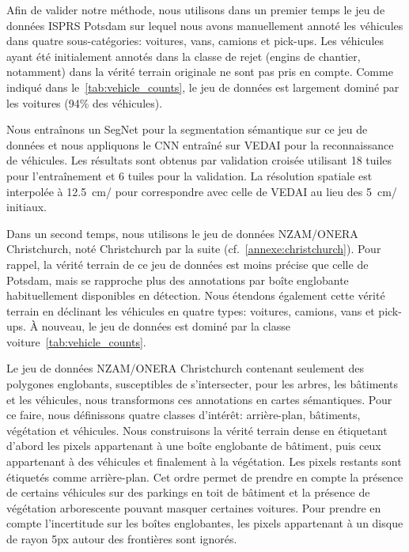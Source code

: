 Afin de valider notre méthode, nous utilisons dans un premier temps le jeu de données \gls{ISPRS} Potsdam sur lequel nous avons manuellement annoté les véhicules dans quatre sous-catégories: voitures, vans, camions et pick-ups. Les véhicules ayant été initialement annotés dans la classe de rejet (engins de chantier, notamment) dans la vérité terrain originale ne sont pas pris en compte. Comme indiqué dans le~\cref{tab:vehicle_counts}, le jeu de données est largement dominé par les voitures (94\% des véhicules).

Nous entraînons un SegNet pour la segmentation sémantique sur ce jeu de données et nous appliquons le \gls{CNN} entraîné sur \gls{VEDAI} pour la reconnaissance de véhicules. Les résultats sont obtenus par validation croisée utilisant 18 tuiles pour l'entraînement et 6 tuiles pour la validation. La résolution spatiale est interpolée à \SI{12,5}{\centi\meter/\px} pour correspondre avec celle de \gls{VEDAI} au lieu des \SI{5}{\centi\meter/\px} initiaux.

Dans un second temps, nous utilisons le jeu de données NZAM/ONERA Christchurch, noté Christchurch par la suite (cf.~\cref{annexe:christchurch}). Pour rappel, la vérité terrain de ce jeu de données est moins précise que celle de Potsdam, mais se rapproche plus des annotations par boîte englobante habituellement disponibles en détection. Nous étendons également cette vérité terrain en déclinant les véhicules en quatre types: voitures, camions, vans et pick-ups. À nouveau, le jeu de données est dominé par la classe voiture~\cref{tab:vehicle_counts}.

Le jeu de données NZAM/ONERA Christchurch contenant seulement des polygones englobants, susceptibles de s'intersecter, pour les arbres, les bâtiments et les véhicules, nous transformons ces annotations en cartes sémantiques. Pour ce faire, nous définissons quatre classes d'intérêt: arrière-plan, bâtiments, végétation et véhicules. Nous construisons la vérité terrain dense en étiquetant d'abord les pixels appartenant à une boîte englobante de bâtiment, puis ceux appartenant à des véhicules et finalement à la végétation. Les pixels restants sont étiquetés comme arrière-plan. Cet ordre permet de prendre en compte la présence de certains véhicules sur des parkings en toit de bâtiment et la présence de végétation arborescente pouvant masquer certaines voitures. Pour prendre en compte l'incertitude sur les boîtes englobantes, les pixels appartenant à un disque de rayon 5px autour des frontières sont ignorés.

